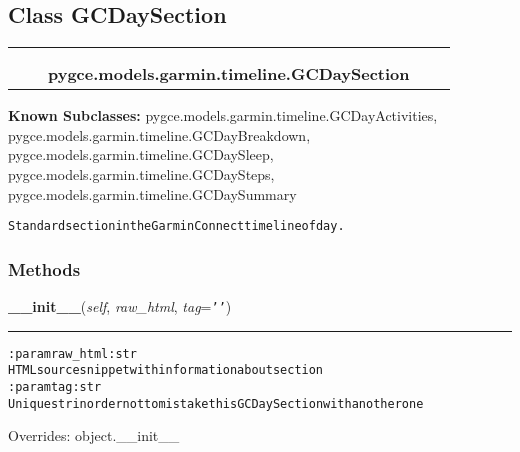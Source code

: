\subsection{Class GCDaySection}

    \label{pygce:models:garmin:timeline:GCDaySection}
\begin{tabular}{cccccc}
\multicolumn{2}{r}{\settowidth{\BCL}{object}\multirow{2}{\BCL}{object}}
&&
  \\\cline{3-3}
  &&\multicolumn{1}{c|}{}
&&
  \\
&&\multicolumn{2}{l}{\textbf{pygce.models.garmin.timeline.GCDaySection}}
\end{tabular}

\textbf{Known Subclasses:}
pygce.models.garmin.timeline.GCDayActivities,
    pygce.models.garmin.timeline.GCDayBreakdown,
    pygce.models.garmin.timeline.GCDaySleep,
    pygce.models.garmin.timeline.GCDaySteps,
    pygce.models.garmin.timeline.GCDaySummary

\begin{alltt}

Standard section in the Garmin Connect timeline of day.
\end{alltt}



  \subsubsection{Methods}

    \vspace{0.5ex}

\hspace{.8\funcindent}\begin{boxedminipage}{\funcwidth}

    \raggedright \textbf{\_\_init\_\_}(\textit{self}, \textit{raw\_html}, \textit{tag}={\tt \texttt{'}\texttt{}\texttt{'}})

    \vspace{-1.5ex}

    \rule{\textwidth}{0.5\fboxrule}
\setlength{\parskip}{2ex}
\begin{alltt}

:param raw\_html: str
    HTML source snippet with information about section
:param tag: str
    Unique str in order not to mistake this GCDaySection with another one
\end{alltt}

\setlength{\parskip}{1ex}
      Overrides: object.\_\_init\_\_

    \end{boxedminipage}

